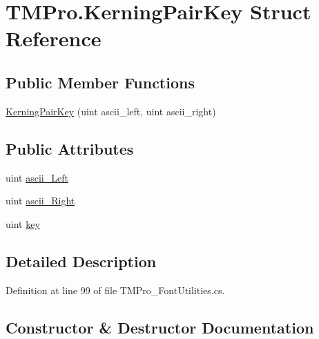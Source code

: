 \hypertarget{struct_t_m_pro_1_1_kerning_pair_key}{}\section{T\+M\+Pro.\+Kerning\+Pair\+Key Struct Reference}
\label{struct_t_m_pro_1_1_kerning_pair_key}
\subsection*{Public Member Functions}
\begin{DoxyCompactItemize}
\item 
\mbox{\hyperlink{struct_t_m_pro_1_1_kerning_pair_key_ae84196a2de7996012278b0d4f66d855c}{Kerning\+Pair\+Key}} (uint ascii\+\_\+left, uint ascii\+\_\+right)
\end{DoxyCompactItemize}
\subsection*{Public Attributes}
\begin{DoxyCompactItemize}
\item 
uint \mbox{\hyperlink{struct_t_m_pro_1_1_kerning_pair_key_a9e98e6259b156ab204370b1784f3a4a9}{ascii\+\_\+\+Left}}
\item 
uint \mbox{\hyperlink{struct_t_m_pro_1_1_kerning_pair_key_af8b7c50138acb86956a10f9e7ffb23cd}{ascii\+\_\+\+Right}}
\item 
uint \mbox{\hyperlink{struct_t_m_pro_1_1_kerning_pair_key_a9ba9b62f109bdd654184598abe65cb52}{key}}
\end{DoxyCompactItemize}


\subsection{Detailed Description}


Definition at line 99 of file T\+M\+Pro\+\_\+\+Font\+Utilities.\+cs.



\subsection{Constructor \& Destructor Documentation}
\mbox{\label{struct_t_m_pro_1_1_kerning_pair_key_ae84196a2de7996012278b0d4f66d855c}} 
